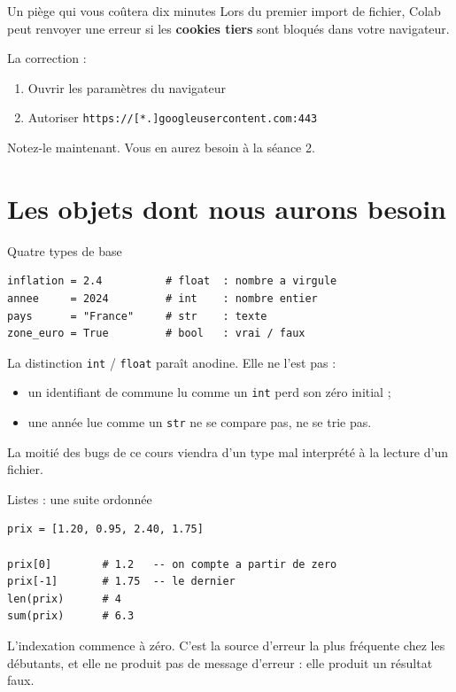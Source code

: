\documentclass[10pt,aspectratio=169]{beamer}
\begin{document}
\begin{frame}{Un piège qui vous coûtera dix minutes}
Lors du premier import de fichier, Colab peut renvoyer une erreur si les \textbf{cookies tiers} sont bloqués dans votre navigateur.

\vspace{1.2em}
La correction :
\begin{enumerate}
  \item Ouvrir les paramètres du navigateur
  \item Autoriser \texttt{https://[*.]googleusercontent.com:443}
\end{enumerate}

\vspace{1.2em}
Notez-le maintenant. Vous en aurez besoin à la séance 2.
\end{frame}

\section{Les objets dont nous aurons besoin}

\begin{frame}[fragile]{Quatre types de base}
\begin{lstlisting}
inflation = 2.4          # float  : nombre a virgule
annee     = 2024         # int    : nombre entier
pays      = "France"     # str    : texte
zone_euro = True         # bool   : vrai / faux
\end{lstlisting}

\vspace{1.2em}
La distinction \texttt{int} / \texttt{float} paraît anodine. Elle ne l'est pas :
\begin{itemize}
  \item un identifiant de commune lu comme un \texttt{int} perd son zéro initial ;
  \item une année lue comme un \texttt{str} ne se compare pas, ne se trie pas.
\end{itemize}

\vspace{0.6em}
La moitié des bugs de ce cours viendra d'un type mal interprété à la lecture d'un fichier.
\end{frame}

\begin{frame}[fragile]{Listes : une suite ordonnée}
\begin{lstlisting}
prix = [1.20, 0.95, 2.40, 1.75]

prix[0]        # 1.2   -- on compte a partir de zero
prix[-1]       # 1.75  -- le dernier
len(prix)      # 4
sum(prix)      # 6.3
\end{lstlisting}

\vspace{1.2em}
L'indexation commence à \alert{zéro}. C'est la source d'erreur la plus fréquente chez les débutants, et elle ne produit pas de message d'erreur : elle produit un résultat faux.
\end{frame}
\end{document}

